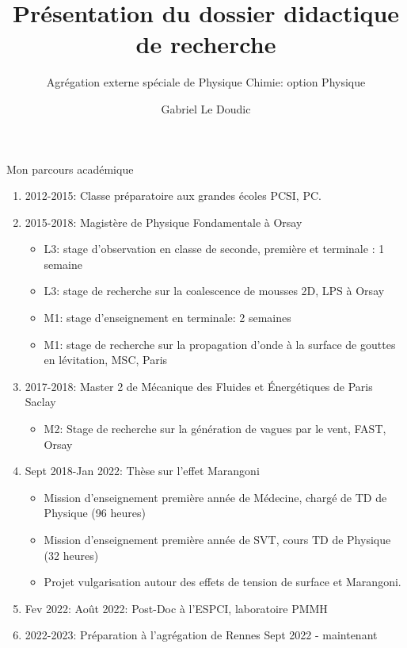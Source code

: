 \documentclass[aspectratio=169,10pt]{beamer}
\title{Présentation du dossier didactique de recherche}
\subtitle{Agrégation externe spéciale de Physique Chimie: option Physique}
\author{Gabriel Le Doudic}
\institute{Préparation à l'agrégation de Rennes 1}
\begin{document}
\maketitle
\begin{frame}{Mon parcours académique}
    \begin{enumerate}
        \item 2012-2015: Classe préparatoire aux grandes écoles PCSI, PC.
        \item  2015-2018: Magistère de Physique Fondamentale à Orsay
        \begin{itemize}
            \item L3: stage d'observation en classe de seconde, première et terminale : 1 semaine
            \item L3: stage de recherche sur la coalescence de mousses 2D, LPS à Orsay
            \item M1: stage d'enseignement en terminale: 2 semaines
            \item M1: stage de recherche sur la propagation d'onde à la surface de gouttes en lévitation, MSC, Paris
        \end{itemize}
        \item 2017-2018: Master 2 de Mécanique des Fluides et Énergétiques de Paris Saclay
       
        \begin{itemize}
            \item M2: Stage de recherche sur la génération de vagues par le vent, FAST, Orsay
        \end{itemize}

        \item Sept 2018-Jan 2022: Thèse sur l'effet Marangoni
        \begin{itemize}
            \item Mission d'enseignement première année de Médecine, chargé de TD de Physique (96 heures)
            \item Mission d'enseignement première année de SVT, cours TD de Physique (32 heures)
            \item Projet vulgarisation autour des effets de tension de surface et Marangoni.
        \end{itemize}
        \item Fev 2022: Août 2022: Post-Doc à l'ESPCI, laboratoire PMMH
        \item 2022-2023: Préparation à l'agrégation de Rennes Sept 2022 - maintenant 
    \end{enumerate}
\end{frame}
\end{document}

